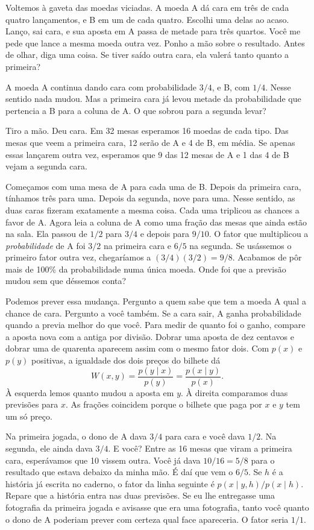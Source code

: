 Voltemos à gaveta das moedas viciadas. A moeda A dá cara em três de cada quatro lançamentos, e B em um de cada quatro. Escolhi uma delas ao acaso. Lanço, sai cara, e sua aposta em A passa de metade para três quartos. Você me pede que lance a mesma moeda outra vez. Ponho a mão sobre o resultado. Antes de olhar, diga uma coisa. Se tiver saído outra cara, ela valerá tanto quanto a primeira?

A moeda A continua dando cara com probabilidade $3/4$, e B, com $1/4$. Nesse sentido nada mudou. Mas a primeira cara já levou metade da probabilidade que pertencia a B para a coluna de A. O que sobrou para a segunda levar?

Tiro a mão. Deu cara. Em 32 mesas esperamos 16 moedas de cada tipo. Das mesas que veem a primeira cara, 12 serão de A e 4 de B, em média. Se apenas essas lançarem outra vez, esperamos que 9 das 12 mesas de A e 1 das 4 de B vejam a segunda cara.

\mesas

Começamos com uma mesa de A para cada uma de B. Depois da primeira cara, tínhamos três para uma. Depois da segunda, nove para uma. Nesse sentido, as duas caras fizeram exatamente a mesma coisa. Cada uma triplicou as chances a favor de A. Agora leia a coluna de A como uma fração das mesas que ainda estão na sala. Ela passou de $1/2$ para $3/4$ e depois para $9/10$. O fator que multiplicou a \emph{probabilidade} de A foi $3/2$ na primeira cara e $6/5$ na segunda. Se usássemos o primeiro fator outra vez, chegaríamos a $(3/4)(3/2)=9/8$. Acabamos de pôr mais de 100\% da probabilidade numa única moeda. Onde foi que a previsão mudou sem que déssemos conta?

Podemos prever essa mudança. Pergunto a quem sabe que tem a moeda A qual a chance de cara. Pergunto a você também. Se a cara sair, A ganha probabilidade quando a previa melhor do que você. Para medir de quanto foi o ganho, compare a aposta nova com a antiga por divisão. Dobrar uma aposta de dez centavos e dobrar uma de quarenta aparecem assim com o mesmo fator dois. Com $p(x)$ e $p(y)$ positivas, a igualdade dos dois preços do bilhete dá
\[
 W(x,y)=\frac{p(y\mid x)}{p(y)}
       =\frac{p(x\mid y)}{p(x)}.
\]
À esquerda lemos quanto mudou a aposta em $y$. À direita comparamos duas previsões para $x$. As frações coincidem porque o bilhete que paga por $x$ e $y$ tem um só preço.

Na primeira jogada, o dono de A dava $3/4$ para cara e você dava $1/2$. Na segunda, ele ainda dava $3/4$. E você? Entre as 16 mesas que viram a primeira cara, esperávamos que 10 vissem outra. Você já dava $10/16=5/8$ para o resultado que estava debaixo da minha mão. É daí que vem o $6/5$. Se $h$ é a história já escrita no caderno, o fator da linha seguinte é $p(x\mid y,h)/p(x\mid h)$. Repare que a história entra nas duas previsões. Se eu lhe entregasse uma fotografia da primeira jogada e avisasse que era uma fotografia, tanto você quanto o dono de A poderiam prever com certeza qual face apareceria. O fator seria $1/1$.

